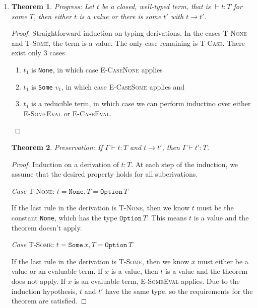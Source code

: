 \documentclass[13pt, a4paper]{article}
\newtheorem{theorem}{Theorem}
\begin{document}
\begin{enumerate}
\item %

\begin{theorem}\label{thm:2-progress}
Progress: Let $t$ be a closed, well-typed term, that is $\vdash t:T$ for some $T$, then either $t$ is a value or there is some $t'$ with $t\to t'$.
\end{theorem}
\begin{proof}

Straightforward induction on typing derivations. In the cases \textsc{T-None} and \textsc{T-Some}, the term is a value. The only case remaining is \textsc{T-Case}. There exist only 3 cases

\begin{enumerate}
\item $t_1$ is \texttt{None}, in which case \textsc{E-CaseNone} applies
\item $t_1$ is \texttt{Some} $v_1$, in which case \textsc{E-CaseSome} applies and
\item $t_1$ is a reducible term, in which case we can perform inductino over either \textsc{E-SomeEval} or \textsc{E-CaseEval}.
\end{enumerate}

\end{proof}

\begin{theorem}\label{thm:2-progress}
Preservation: If $\Gamma \vdash t:T$ and $t\to t'$, then $\Gamma \vdash t' : T$.
\end{theorem}
\begin{proof}
Induction on a derivation of $t:T$. At each step of the induction, we assume that the desired property holds for all suberivations.

\textit{Case} \textsc{T-None}: $t = \texttt{None}, T = \texttt{Option}\,T$

If the last rule in the derivation is \textsc{T-None}, then we know $t$ must be the constant \texttt{None}, which has the type $\texttt{Option}\,T$. This means $t$ is a value and the theorem doesn't apply.

\textit{Case} \textsc{T-Some}: $t = \texttt{Some}\,x, T = \texttt{Option}\,T$

If the last rule in the derivation is \textsc{T-Some}, then we know $x$ must either be a value or an evaluable term. If $x$ is a value, then $t$ is a value and the theorem does not apply. If $x$ is an evaluable term, \textsc{E-SomeEval} applies. Due to the induction hypothesis, $t$ and $t'$ have the same type, so the requirements for the theorem are satisfied.


\end{proof}
\end{enumerate}
\end{document}
